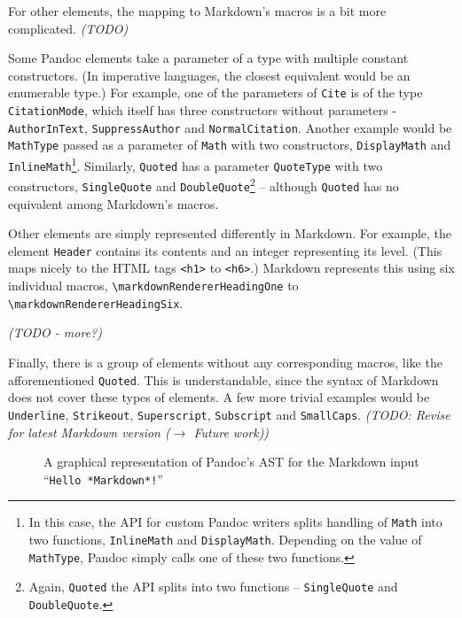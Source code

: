 \documentclass[
  digital,     %
  oneside,     %
  nosansbold,  %
  nocolorbold, %
  lof,         %
  lot,         %
]{fithesis4}
\newcommand{\renderer}[1]{\texttt{\textbackslash{}markdownRenderer{#1}}}
\begin{document}
For other elements, the mapping to Markdown's macros is a bit more complicated. \emph{(TODO)}

Some Pandoc elements take a parameter of a type with multiple constant constructors. (In imperative languages, the closest equivalent would be an enumerable type.) For example, one of the parameters of \texttt{Cite} is of the type \texttt{CitationMode}, which itself has three constructors without parameters - \texttt{AuthorInText}, \texttt{SuppressAuthor} and \texttt{NormalCitation}. Another example would be \texttt{MathType} passed as a parameter of \texttt{Math} with two constructors, \texttt{DisplayMath} and \texttt{InlineMath}\footnote{In this case, the API for custom Pandoc writers splits handling of \texttt{Math} into two functions, \texttt{InlineMath} and \texttt{DisplayMath}. Depending on the value of \texttt{MathType}, Pandoc simply calls one of these two functions.}. Similarly, \texttt{Quoted} has a parameter \texttt{QuoteType} with two constructors, \texttt{SingleQuote} and \texttt{DoubleQuote}\footnote{Again, \texttt{Quoted} the API splits into two functions -- \texttt{SingleQuote} and \texttt{DoubleQuote}.} -- although \texttt{Quoted} has no equivalent among Markdown's macros.

Other elements are simply represented differently in Markdown. For example, the element \texttt{Header} contains its contents and an integer representing its level. (This maps nicely to the HTML tags \texttt{<h1>} to \texttt{<h6>}.) Markdown represents this using six individual macros, \renderer{HeadingOne} to \renderer{HeadingSix}.

\emph{(TODO - more?)}

Finally, there is a group of elements without any corresponding macros, like the afforementioned \texttt{Quoted}. This is understandable, since the syntax of Markdown does not cover these types of elements. A few more trivial examples would be \texttt{Underline}, \texttt{Strikeout}, \texttt{Superscript}, \texttt{Subscript} and \texttt{SmallCaps}. \emph{(TODO: Revise for latest Markdown version ($\rightarrow$ Future work))}

\begin{figure}
  \centering
  \caption{A graphical representation of Pandoc's AST for the Markdown input ``\texttt{Hello *Markdown*!}''}
  \label{fig:pandoc-ast}
\end{figure}
\end{document}
